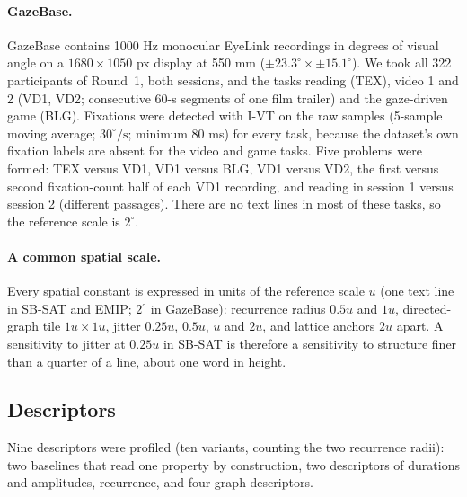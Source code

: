 \documentclass[11pt]{article}
\begin{document}
\paragraph{GazeBase.} GazeBase \citep{griffith2021gazebase} contains 1000 Hz monocular EyeLink recordings in degrees of visual angle on a $1680\times1050$ px display at 550 mm ($\pm 23.3^\circ\times\pm 15.1^\circ$). We took all 322 participants of Round~1, both sessions, and the tasks reading (TEX), video 1 and 2 (VD1, VD2; consecutive 60-s segments of one film trailer) and the gaze-driven game (BLG). Fixations were detected with I-VT on the raw samples (5-sample moving average; $30^\circ/\mathrm{s}$; minimum 80 ms) for every task, because the dataset's own fixation labels are absent for the video and game tasks. Five problems were formed: TEX versus VD1, VD1 versus BLG, VD1 versus VD2, the first versus second fixation-count half of each VD1 recording, and reading in session 1 versus session 2 (different passages). There are no text lines in most of these tasks, so the reference scale is $2^\circ$.

\paragraph{A common spatial scale.} Every spatial constant is expressed in units of the reference scale $u$ (one text line in SB-SAT and EMIP; $2^\circ$ in GazeBase): recurrence radius $0.5u$ and $1u$, directed-graph tile $1u\times1u$, jitter $0.25u$, $0.5u$, $u$ and $2u$, and lattice anchors $2u$ apart. A sensitivity to jitter at $0.25u$ in SB-SAT is therefore a sensitivity to structure finer than a quarter of a line, about one word in height.

\begin{table}[!htbp]
\centering\small
\caption{The thirteen problems. Label level: whether the label varies within participants, is constant within each participant, or both. Trials and participants after exclusions.}
\label{tab:problems}
\resizebox{\linewidth}{!}{}
\end{table}

\subsection{Descriptors}\label{sec:desc}
Nine descriptors were profiled (ten variants, counting the two recurrence radii): two baselines that read one property by construction, two descriptors of durations and amplitudes, recurrence, and four graph descriptors.
\end{document}
